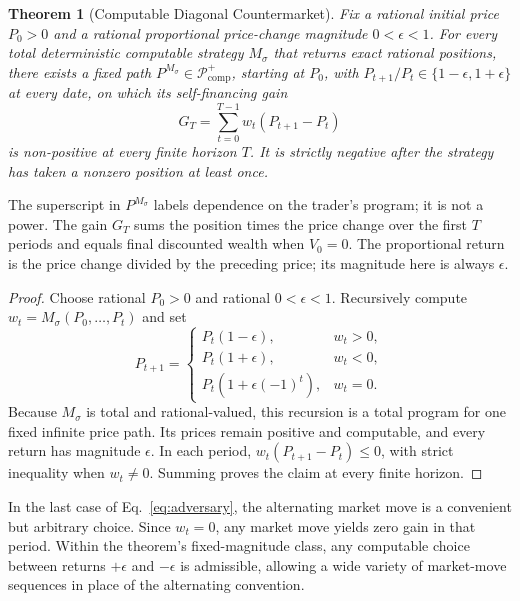 \documentclass[aps,pra,reprint,superscriptaddress,amsmath,amssymb,floatfix]{revtex4-2}
\theoremstyle{plain}
\newtheorem{theorem}{Theorem}
\theoremstyle{definition}
\theoremstyle{remark}
\begin{document}
\begin{samepage}
\begin{theorem}[Computable Diagonal Countermarket]
  \label{thm:counterpath}
  Fix a rational initial price \(P_0>0\) and a rational proportional price-change
  magnitude \(0<\epsilon<1\). For every total deterministic computable strategy \(M_\sigma\)
that returns exact rational positions, there exists a fixed path
  \(P^{M_\sigma}\in\mathcal P_{\mathrm{comp}}^{+}\), starting at \(P_0\), with
  \(P_{t+1}/P_t\in\{1-\epsilon,1+\epsilon\}\) at every date, on which its
  self-financing gain
  \[
    G_T=\sum_{t=0}^{T-1}w_t(P_{t+1}-P_t)
  \]
  is non-positive at every finite horizon \(T\). It is strictly negative after
  the strategy has taken a nonzero position at least once.
\end{theorem}
\end{samepage}
The superscript in \(P^{M_\sigma}\) labels dependence on the trader's program;
it is not a power. The gain \(G_T\) sums the position times the price change
over the first \(T\) periods and equals final discounted wealth when
\(V_0=0\). The proportional return is the price change divided by the
preceding price; its magnitude here is always \(\epsilon\).

\begin{proof}
Choose rational \(P_0>0\) and rational \(0<\epsilon<1\). Recursively compute
\(w_t=M_\sigma(P_0,\ldots,P_t)\) and set
\begin{equation}
P_{t+1}=
\begin{cases}
P_t(1-\epsilon),&w_t>0,\\
P_t(1+\epsilon),&w_t<0,\\
P_t(1+\epsilon(-1)^t),&w_t=0.
\end{cases}
\label{eq:adversary}
\end{equation}
Because \(M_\sigma\) is total and rational-valued, this recursion is a total
program for one fixed infinite price path. Its prices remain positive and
computable, and every return has magnitude \(\epsilon\). In each period,
\(w_t(P_{t+1}-P_t)\leq0\), with strict inequality when \(w_t\neq0\).
Summing proves the claim at every finite horizon.
\end{proof}

In the last case of Eq.~\eqref{eq:adversary}, the alternating market move is a
convenient but arbitrary choice. Since \(w_t=0\), any market move yields zero
gain in that period. Within the theorem's fixed-magnitude class, any computable
choice between returns \(+\epsilon\) and \(-\epsilon\) is admissible, allowing
a wide variety of market-move sequences in place of the alternating convention.
\end{document}
